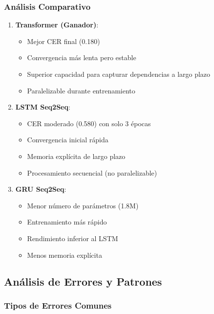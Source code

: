 \documentclass[12pt,a4paper]{article}
\begin{document}
\subsubsection{Análisis Comparativo}

\begin{enumerate}
    \item \textbf{Transformer (Ganador)}:
    \begin{itemize}
        \item Mejor CER final (0.180)
        \item Convergencia más lenta pero estable
        \item Superior capacidad para capturar dependencias a largo plazo
        \item Paralelizable durante entrenamiento
    \end{itemize}

    \item \textbf{LSTM Seq2Seq}:
    \begin{itemize}
        \item CER moderado (0.580) con solo 3 épocas
        \item Convergencia inicial rápida
        \item Memoria explícita de largo plazo
        \item Procesamiento secuencial (no paralelizable)
    \end{itemize}

    \item \textbf{GRU Seq2Seq}:
    \begin{itemize}
        \item Menor número de parámetros (1.8M)
        \item Entrenamiento más rápido
        \item Rendimiento inferior al LSTM
        \item Menos memoria explícita
    \end{itemize}
\end{enumerate}

\subsection{Análisis de Errores y Patrones}

\subsubsection{Tipos de Errores Comunes}
\end{document}
